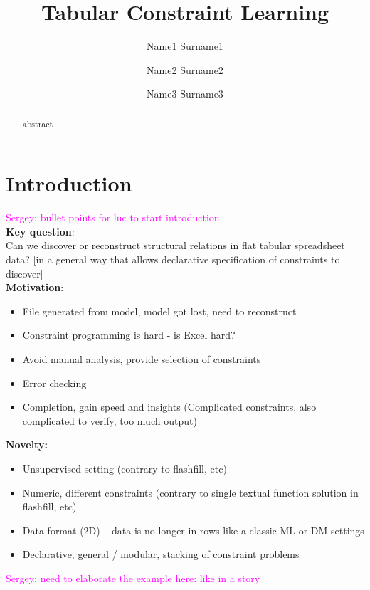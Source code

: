\documentclass{ecai}
\newcommand{\sergey}[1]{\textcolor{magenta}{{\sc Sergey:} #1}\xspace}
\begin{document}
\title{Tabular Constraint Learning}

\author{Name1 Surname1 \and Name2 Surname2 \and Name3 Surname3  }

\maketitle

\begin{abstract}
  abstract
\end{abstract}
\section{Introduction}
\sergey{bullet points for luc to start introduction}\\
\textbf{Key question}:\\
Can we discover or reconstruct structural relations in flat tabular spreadsheet data? [in a general way that allows declarative specification of constraints to discover]\\


\textbf{Motivation}:
\begin{itemize}
  \item File generated from model, model got lost, need to reconstruct
  \item Constraint programming is hard - is Excel hard?
  \item Avoid manual analysis, provide selection of constraints
  \item Error checking
  \item Completion, gain speed and insights (Complicated constraints, also complicated to verify, too much output)
\end{itemize}

\textbf{Novelty:}
\begin{itemize}
  \item Unsupervised setting (contrary to flashfill, etc)
  \item Numeric, different constraints (contrary to single textual function solution in flashfill, etc)
  \item Data format (2D) -- data is no longer in rows like a classic ML or DM settings
  \item Declarative, general / modular, stacking of constraint problems 
\end{itemize}

\sergey{need to elaborate the example here: like in a story} 
\end{document}

